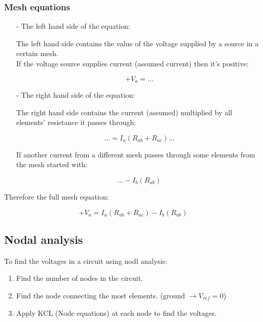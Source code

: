 \documentclass[a4paper]{book}
\begin{document}
\subsubsection{Mesh equations}

\begin{itemize}

  \item[-] The left hand side of the equation:

    The left hand side contains the value of the voltage supplied by a source in a certain mesh.\\
    If the voltage source supplies current (assumed current) then it's positive:

    \[+V_a = \dots\]

  \item[-] The right hand side of the equation:

    The right hand side contains the current (assumed) multiplied by all elements' resistance it passes through:

    \[\ldots = I_a(R_{ab} + R_{ac}) \ldots\]

    If another current from a different mesh passes through some elements from the mesh started with:

    \[\ldots - I_b(R_{ab})\]

\end{itemize}

Therefore the full mesh equation:

\[+V_a = I_a(R_{ab} + R_{ac}) - I_b(R_{ab})\]


\subsection{Nodal analysis}

To find the voltages in a circuit using nodl analysis:

\begin{enumerate}

  \item Find the number of nodes in the circuit.
  \item Find the node connecting the most elements. (ground $\to V_{ref} = 0$)
  \item Apply KCL (Node equations) at each node to find the voltages.

\end{enumerate}
\end{document}
